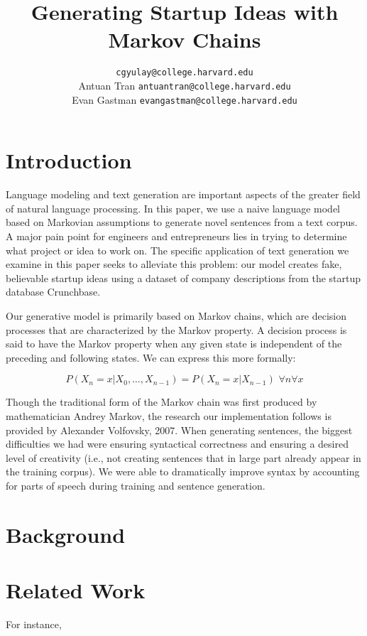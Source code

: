 \documentclass[11pt]{article}
\title{Generating Startup Ideas with Markov Chains}
\author{
  \noindent\makebox[0.57\textwidth][l]{Colton Gyulay} \hfill
  \texttt{cgyulay@college.harvard.edu}\\
  Antuan Tran \hfill
  \texttt{antuantran@college.harvard.edu}\\
  Evan Gastman \hfill
  \texttt{evangastman@college.harvard.edu}
}
\begin{document}
\maketitle{}

\section{Introduction}

Language modeling and text generation are important aspects of the greater
field of natural language processing. In this paper, we use a naive language
model based on Markovian assumptions to generate novel sentences from a text
corpus. A major pain point for engineers and entrepreneurs lies in trying to
determine what project or idea to work on. The specific application of text
generation we examine in this paper seeks to alleviate this problem: our model creates fake, believable startup ideas using a dataset of company descriptions from the startup database Crunchbase.

Our generative model is primarily based on Markov chains, which are decision
processes that are characterized by the Markov property. A decision process is said to have the Markov property when any given state is independent of the preceding and following states. We can express this more formally:

\[ P(X_n = x|X_0,\dots,X_{n-1}) = P(X_n = x|X_{n-1})\,\,\forall{n}\forall{x}\]

Though the traditional form of the Markov chain was first produced by mathematician Andrey Markov, the research our implementation follows is
provided by Alexander Volfovsky, 2007. \cite{volfovsky2007long} When generating sentences, the biggest difficulties we had were ensuring syntactical correctness and ensuring a desired level of creativity (i.e., not creating sentences that in large part already appear in the training corpus). We were able to dramatically improve syntax by accounting for parts of speech during training and sentence generation.

\section{Background}


\section{Related Work}

For instance, \cite{hochreiter1997long}
\end{document}
